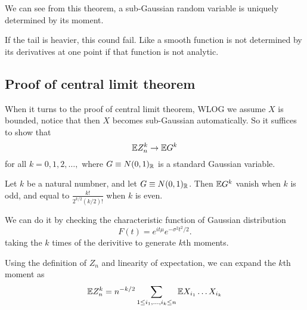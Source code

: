 We can see from this theorem, a sub-Gaussian random variable is uniquely determined by its moment. 

If the tail is heavier, this cound fail. Like a smooth function is not determined by its derivatives at one point if that function is not analytic. 


\subsection{Proof of central limit theorem}
When it turns to the proof of central limit theorem, WLOG we assume $X$ is bounded, notice that then $X$ becomes sub-Gaussian automatically. 
So it suffices to show that 
\begin{equation*}
    \mathbb{E} Z_n^k \to \mathbb{E} G^k
\end{equation*}
for all $k=0,1,2,\dots,$ where $G\equiv N(0,1)_{\mathbb{R}}$  is a standard Gaussian variable.

\begin{proposition}
    Let $k$ be a natural numbner, and let $G\equiv N(0,1)_{\mathbb{R}}$. 
    Then $\mathbb{E} G^k$ vanish when $k$ is odd, and equal to $\frac{k!}{2^{k/2}(k/2)!}$ when $k$ is even. 
\end{proposition}

We can do it by checking the characteristic function of Gaussian distribution 
\begin{equation*}
    F(t) = e^{it\mu}e^{-\sigma^2 t^2/2}.
\end{equation*}
taking the $k$ times of the derivitive to generate $k$th moments.

Using the definition of $Z_n$ and linearity of expectation, we can expand the $k$th moment as 
\begin{equation*}
    \mathbb{E} Z_n^k = n^{-k/2}\sum_{1\leq i_1,\dots,i_k\leq n} \mathbb{E} X_{i_1}\dots X_{i_k}
\end{equation*}

